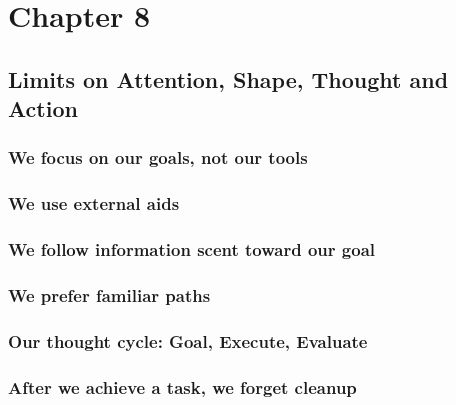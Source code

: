 \documentclass[11pt,]{article}
\begin{document}
\hypertarget{chapter-8}{%
\section{Chapter 8}\label{chapter-8}}

\hypertarget{limits-on-attention-shape-thought-and-action}{%
\subsection{Limits on Attention, Shape, Thought and
Action}\label{limits-on-attention-shape-thought-and-action}}

\hypertarget{we-focus-on-our-goals-not-our-tools}{%
\subsubsection{We focus on our goals, not our
tools}\label{we-focus-on-our-goals-not-our-tools}}

\hypertarget{we-use-external-aids}{%
\subsubsection{We use external aids}\label{we-use-external-aids}}

\hypertarget{we-follow-information-scent-toward-our-goal}{%
\subsubsection{We follow information scent toward our
goal}\label{we-follow-information-scent-toward-our-goal}}

\hypertarget{we-prefer-familiar-paths}{%
\subsubsection{We prefer familiar
paths}\label{we-prefer-familiar-paths}}

\hypertarget{our-thought-cycle-goal-execute-evaluate}{%
\subsubsection{Our thought cycle: Goal, Execute,
Evaluate}\label{our-thought-cycle-goal-execute-evaluate}}

\hypertarget{after-we-achieve-a-task-we-forget-cleanup}{%
\subsubsection{After we achieve a task, we forget
cleanup}\label{after-we-achieve-a-task-we-forget-cleanup}}
\end{document}
